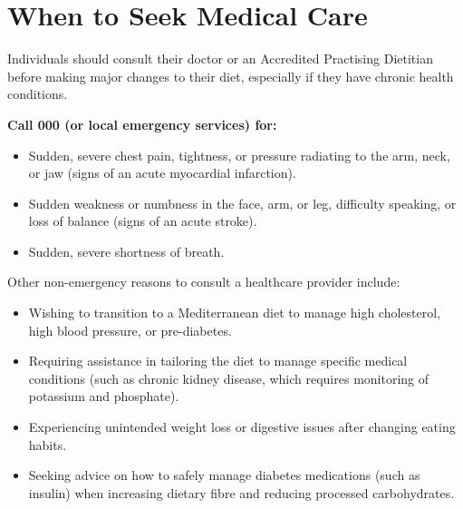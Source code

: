 \section*{When to Seek Medical Care}
Individuals should consult their doctor or an Accredited Practising Dietitian before making major changes to their diet, especially if they have chronic health conditions.

\textbf{Call 000 (or local emergency services) for:}
\begin{itemize}
    \item Sudden, severe chest pain, tightness, or pressure radiating to the arm, neck, or jaw (signs of an acute myocardial infarction).
    \item Sudden weakness or numbness in the face, arm, or leg, difficulty speaking, or loss of balance (signs of an acute stroke).
    \item Sudden, severe shortness of breath.
\end{itemize}

Other non-emergency reasons to consult a healthcare provider include:
\begin{itemize}
    \item Wishing to transition to a Mediterranean diet to manage high cholesterol, high blood pressure, or pre-diabetes.
    \item Requiring assistance in tailoring the diet to manage specific medical conditions (such as chronic kidney disease, which requires monitoring of potassium and phosphate).
    \item Experiencing unintended weight loss or digestive issues after changing eating habits.
    \item Seeking advice on how to safely manage diabetes medications (such as insulin) when increasing dietary fibre and reducing processed carbohydrates.
\end{itemize}

